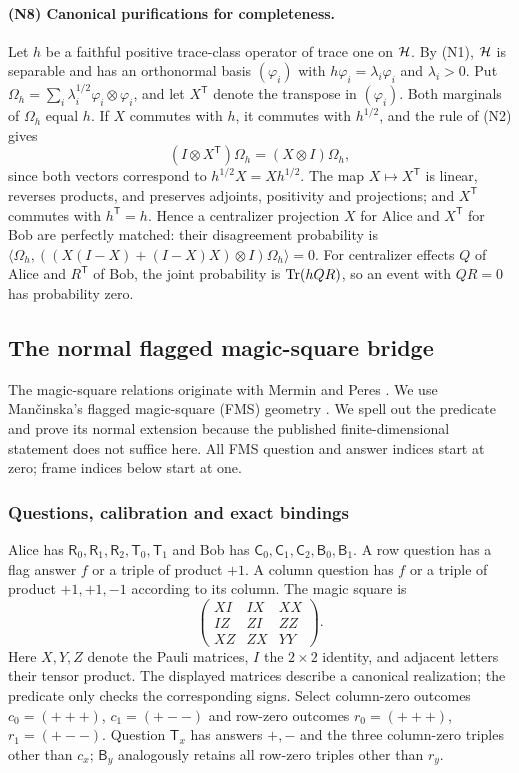 \paragraph{(N8) Canonical purifications for completeness.}
Let $h$ be a faithful positive trace-class operator of trace one on $\mathcal H$. By (N1), $\mathcal H$ is separable and has an orthonormal basis $(\varphi_i)$ with $h\varphi_i=\lambda_i\varphi_i$ and $\lambda_i>0$. Put $\Omega_h=\sum_i\lambda_i^{1/2}\varphi_i\otimes\varphi_i$, and let $X^{\mathsf T}$ denote the transpose in $(\varphi_i)$. Both marginals of $\Omega_h$ equal $h$. If $X$ commutes with $h$, it commutes with $h^{1/2}$, and the rule of (N2) gives
\[
 (I\otimes X^{\mathsf T})\Omega_h=(X\otimes I)\Omega_h,
\]
since both vectors correspond to $h^{1/2}X=Xh^{1/2}$. The map $X\mapsto X^{\mathsf T}$ is linear, reverses products, and preserves adjoints, positivity and projections; and $X^{\mathsf T}$ commutes with $h^{\mathsf T}=h$. Hence a centralizer projection $X$ for Alice and $X^{\mathsf T}$ for Bob are perfectly matched: their disagreement probability is $\langle\Omega_h,((X(I-X)+(I-X)X)\otimes I)\Omega_h\rangle=0$. For centralizer effects $Q$ of Alice and $R^{\mathsf T}$ of Bob, the joint probability is $\operatorname{Tr}(hQR)$, so an event with $QR=0$ has probability zero.

\subsection{The normal flagged magic-square bridge}\label{sec:bridge}
The magic-square relations originate with Mermin and Peres \cite{Mermin,Peres}. We use Man\v{c}inska's flagged magic-square (FMS) geometry \cite{Mancinska}. We spell out the predicate and prove its normal extension because the published finite-dimensional statement does not suffice here. All FMS question and answer indices start at zero; frame indices below start at one.

\subsubsection{Questions, calibration and exact bindings}
Alice has $\mathsf R_0,\mathsf R_1,\mathsf R_2,\mathsf T_0,\mathsf T_1$ and Bob has $\mathsf C_0,\mathsf C_1,\mathsf C_2,\mathsf B_0,\mathsf B_1$. A row question has a flag answer $f$ or a triple of product $+1$. A column question has $f$ or a triple of product $+1,+1,-1$ according to its column. The magic square is
\begin{equation}\label{eq:square}
\begin{pmatrix}XI&IX&XX\\ IZ&ZI&ZZ\\ XZ&ZX&YY\end{pmatrix}.
\end{equation}
Here $X,Y,Z$ denote the Pauli matrices, $I$ the $2\times2$ identity, and adjacent letters their tensor product. The displayed matrices describe a canonical realization; the predicate only checks the corresponding signs. Select column-zero outcomes $c_0=(+++)$, $c_1=(+--)$ and row-zero outcomes $r_0=(+++)$, $r_1=(+--)$. Question $\mathsf T_x$ has answers $+,-$ and the three column-zero triples other than $c_x$; $\mathsf B_y$ analogously retains all row-zero triples other than $r_y$.

